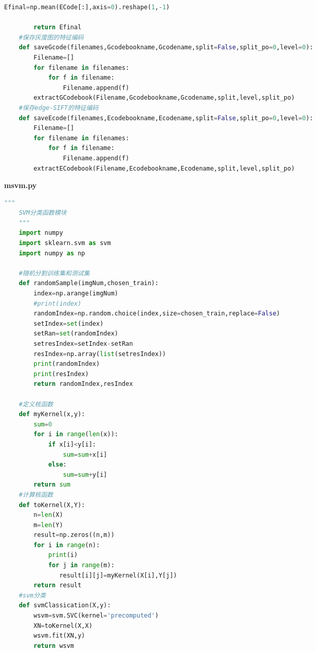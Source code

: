 \documentclass[supercite]{HustGraduPaper}
\begin{document}
\begin{sloppypar}
\begin{appendices}
\begin{spacing}{1.25}
\begin{lstlisting}[language=python]
        Efinal=np.mean(ECode[:],axis=0).reshape(1,-1)
    
        return Efinal
    #保存灰度图的特征编码
    def saveGcode(filenames,Gcodebookname,Gcodename,split=False,split_po=0,level=0):
        Filename=[]
        for filename in filenames:
            for f in filename:
                Filename.append(f)
        extractGCodebook(Filename,Gcodebookname,Gcodename,split,level,split_po)
    #保存edge-SIFT的特征编码
    def saveEcode(filenames,Ecodebookname,Ecodename,split=False,split_po=0,level=0):
        Filename=[]
        for filename in filenames:
            for f in filename:
                Filename.append(f)
        extractECodebook(Filename,Ecodebookname,Ecodename,split,level,split_po)
     \end{lstlisting}
   \end{spacing}
  \textbf{msvm.py}
  \begin{spacing}{1.25}
  \begin{lstlisting}[language=python]
    """
    SVM分类函数模块
    """
    import numpy
    import sklearn.svm as svm
    import numpy as np
    
    #随机分割训练集和测试集
    def randomSample(imgNum,chosen_train):
        index=np.arange(imgNum)
        #print(index)
        randomIndex=np.random.choice(index,size=chosen_train,replace=False)
        setIndex=set(index)
        setRan=set(randomIndex)
        setresIndex=setIndex-setRan
        resIndex=np.array(list(setresIndex))
        print(randomIndex)
        print(resIndex)
        return randomIndex,resIndex
    
    #定义核函数
    def myKernel(x,y):
        sum=0
        for i in range(len(x)):
            if x[i]<y[i]:
                sum=sum+x[i]
            else:
                sum=sum+y[i]
        return sum
    #计算核函数
    def toKernel(X,Y):
        n=len(X)
        m=len(Y)
        result=np.zeros((n,m))
        for i in range(n):
            print(i)
            for j in range(m):
               result[i][j]=myKernel(X[i],Y[j])
        return result
    #svm分类
    def svmClassication(X,y):
        wsvm=svm.SVC(kernel='precomputed')
        XN=toKernel(X,X)
        wsvm.fit(XN,y)
        return wsvm
  \end{lstlisting}
\end{spacing}

\end{appendices}
\end{sloppypar}
\end{document}
